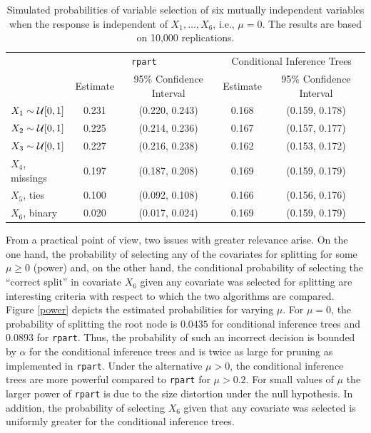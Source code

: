 \begin{table}[t]
\begin{center}
\begin{tabular}{lcccc} 
 & \multicolumn{2}{c}{\texttt{rpart}} & \multicolumn{2}{c}{Conditional Inference Trees} \\
 & Estimate & 95\% Confidence Interval & Estimate & 95\% Confidence Interval \\ \hline
$X_1 \sim \mathcal{U}[0,1]$ & 0.231 & (0.220, 0.243) & 0.168 & (0.159, 0.178) \\
$X_2 \sim \mathcal{U}[0,1]$ & 0.225 & (0.214, 0.236) & 0.167 & (0.157, 0.177) \\
$X_3 \sim \mathcal{U}[0,1]$ & 0.227 & (0.216, 0.238) & 0.162 & (0.153, 0.172) \\
$X_4$, missings & 0.197 & (0.187, 0.208) & 0.169 & (0.159, 0.179) \\
$X_5$, ties & 0.100 & (0.092, 0.108) & 0.166 & (0.156, 0.176) \\
$X_6$, binary & 0.020 & (0.017, 0.024) & 0.169 & (0.159, 0.179) \\ \hline
\end{tabular}
\caption{Simulated probabilities of variable selection of six mutually
         independent variables when the response is independent of $X_1, \dots,
         X_6$, i.e., $\mu = 0$.
         The results are based on 10,000 replications. \label{selprob}}
\end{center}
\end{table}

From a practical point of view, two issues with greater relevance arise. 
On the one
hand, the probability of selecting any of the covariates for splitting 
for some $\mu \ge 0$ (power) and, on the other hand,
the conditional probability of selecting the ``correct split'' in covariate
$X_6$ given any covariate was selected for splitting 
are interesting criteria with respect to which the two algorithms are
compared.
Figure \ref{power} depicts the estimated probabilities for
varying $\mu$. For $\mu = 0$, the probability of splitting the root node is
$0.0435$ for conditional inference trees and $0.0893$ for \texttt{rpart}.
Thus, the probability of such an incorrect decision is bounded by $\alpha$
for the conditional inference trees and is twice as large for pruning as
implemented in \texttt{rpart}. Under
the alternative $\mu > 0$, the conditional inference trees are more powerful
compared to \texttt{rpart} for $\mu > 0.2$. For small values of $\mu$ the
larger power of \texttt{rpart} is due to the size distortion under the null
hypothesis. In addition, the probability of
selecting $X_6$ given that any covariate was selected is uniformly greater
for the conditional inference trees.

